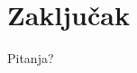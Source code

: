 \documentclass[utf8]{beamer}
\begin{document}
\section{Zaključak}
\begin{frame}

\huge{Pitanja?}

\end{frame}
\end{document}
